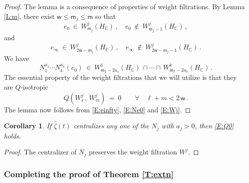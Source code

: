 \documentclass[12pt]{amsart}
\numberwithin{equation}{section}
\numberwithin{table}{section}
\def\z{\zeta}
\def\bC{\mathbb{C}}
\def\sfm{\mathsf{m}}
\def\sfw{\mathsf{w}}
\newtheorem{corollary}[equation]{Corollary}
\theoremstyle{definition}
\theoremstyle{definition}
\theoremstyle{remark}
\begin{document}
\begin{proof}
The lemma is a consequence of properties of weight filtrations.  By Lemma \ref{L:m}, there exist $\sfw \le \sfm_j \le \sfm$ so that
\begin{equation}\label{E:e0W}
  e_0 \ \in \ W^j_{\sfm_j}(H_\bC) \,, \quad
  e_0 \ \not\in \ W^j_{\sfm_j-1}(H_\bC) \,,
\end{equation}
and
\begin{equation}\label{E:einfty}
  e_\infty \ \in \ W^j_{2\sfw-\sfm_j}(H_\bC) \,,\quad
  e_\infty \ \not\in \ W^j_{2\sfw-\sfm_j-1}(H_\bC) \,.
\end{equation}
We have
\begin{equation}\label{E:Ne0}
  N_1^{a_1}\cdots N_k^{a_k}(e_0) \ \in \ 
  W^1_{\sfm_1-2a_1}(H_\bC) \,\cap\cdots\cap\, 
  W^k_{\sfm_k-2a_k}(H_\bC)\,.
\end{equation}
The essential property of the weight filtrations that we will utilize is that they are $Q$-isotropic
\begin{equation}\label{E:Wj}
  Q(W^j_\ell \,,\, W^j_m) \ = \ 0
  \qquad \forall \quad \ell+m< 2\,\sfw \,.
\end{equation}
The lemma now follows from \eqref{E:einfty}, \eqref{E:Ne0} and \eqref{E:Wj}.
\end{proof}

\begin{corollary} \label{C:Q0}
If $\hat\z(t)$ centralizes \emph{any} one of the $N_j$ with $a_j > 0$, then \eqref{E:Q0} holds.
\end{corollary}

\begin{proof}
The centralizer of $N_j$ preserves the weight filtration $W^j$.
\end{proof}


\subsubsection{Completing the proof of Theorem \ref{T:extn}}
\end{document}
